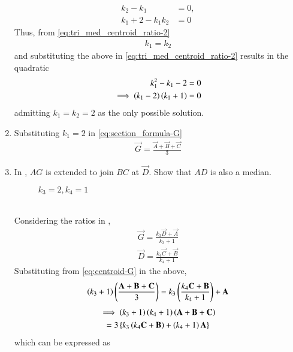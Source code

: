 \begin{enumerate}[label=\thesection.\arabic*.,ref=\thesection.\theenumi]
  \begin{align}
\label{eq:tri_med_centroid_ratio-1}
	  k_2-k_1 &= 0,
	  \\
	  k_1 +2 - k_1k_2 &=0
\label{eq:tri_med_centroid_ratio-2}
  \end{align}
  Thus, from 
\eqref{eq:tri_med_centroid_ratio-2}
  \begin{align}
	  k_1=k_2
  \end{align}
  and substituting the above in 
\eqref{eq:tri_med_centroid_ratio-2} results in the quadratic
  \begin{align}
	  k_1^2 - k_1-2 &=0
	  \\
	  \implies 
	  \left(k_1-2\right)\left(k_1+1\right) &=0
  \end{align}
  admitting $k_1=k_2=2$ as the only possible solution.
  \item Substituting $k_1 =2 $ in 
	  \eqref{eq:section_formula-G}
  \begin{align}
	  \vec{G}=\frac{\vec{A}+\vec{B} + \vec{C}}{3}
	  \label{eq:centroid-G}
  \end{align}
\item 
In	,	
$AG$ is extended to join $BC$ at $\vec{D}$.  Show that $AD$ is also a median.
\begin{figure}[!ht]
	\begin{center}
		\resizebox{\columnwidth}{!}{}
	\end{center}
	\caption{$k_3 = 2, k_4 =1$}
	\label{fig:tri_med_meet}	
\end{figure}
	\\
	\solution Considering the ratios in 
	,	
  \begin{align}
\vec{G} = 
	  \frac{k_3\vec{D}+\vec{A} }{k_3+1} 
	  \\
	\vec{D}  =\frac{k_4\vec{C}+\vec{B} }{k_4+1} 
  \end{align}
  Substituting from 
	  \eqref{eq:centroid-G}
	  in the above, 
  \begin{align}
	  \left(k_3+1\right)\left(\frac{\mathbf{A}+\mathbf{B} + \mathbf{C}}{3}\right)
 = 
	  {k_3\left(\frac{k_4\mathbf{C}+\mathbf{B} }{k_4+1}\right) +\mathbf{A} } 
  \end{align}
\begin{multline}
	  \implies \left(k_3+1\right)\left(k_4+1\right)\left({\mathbf{A}+\mathbf{B} + \mathbf{C}}\right)
	  \\
 = 
	  {3} \left\{ {k_3\left({k_4\mathbf{C}+\mathbf{B} }\right) +\left(k_4+1\right)\mathbf{A} }\right\} 
\end{multline}
  which can be expressed as
  \begin{multline}

\end{multline}
\end{enumerate}
